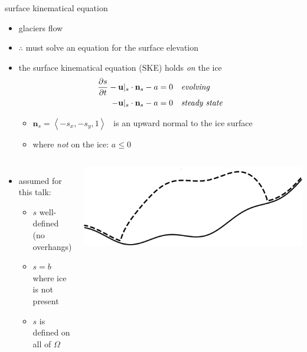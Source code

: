 \documentclass[usepdftitle=false,usenames,dvipsnames]{beamer}
\newcommand{\bn}{\mathbf{n}}
\newcommand{\bu}{\mathbf{u}}
\begin{document}
\begin{frame}{surface kinematical equation}

\begin{itemize}
\item glaciers flow
\item $\therefore$ must solve an equation for the surface elevation
\item the surface kinematical equation (SKE) holds \emph{on} the ice
\begin{align*}
\frac{\partial s}{\partial t} - \bu|_s \cdot \bn_s - a &= 0 & &\text{\emph{evolving}} \\
-\bu|_s \cdot \bn_s - a &= 0 & &\text{\emph{steady state}}
\end{align*}

    \begin{itemize}
    \item $\bn_s = \left<-s_x,-s_y,1\right>$  \, is an upward normal to the ice surface
    \item where \emph{not} on the ice: $a\le 0$
    \end{itemize}
\end{itemize}

\bigskip
\begin{columns}
        \begin{itemize}
        \item assumed for this talk:
            \begin{itemize}
            \item $s$ well-defined (no overhangs)
            \item $s=b$ where ice is not present
            \item $s$ is defined on all of $\Omega$
            \end{itemize}
        \end{itemize}
        \includegraphics[width=1.0\textwidth]{figs/simpledomain.png}
\end{columns}
\end{frame}
\end{document}
